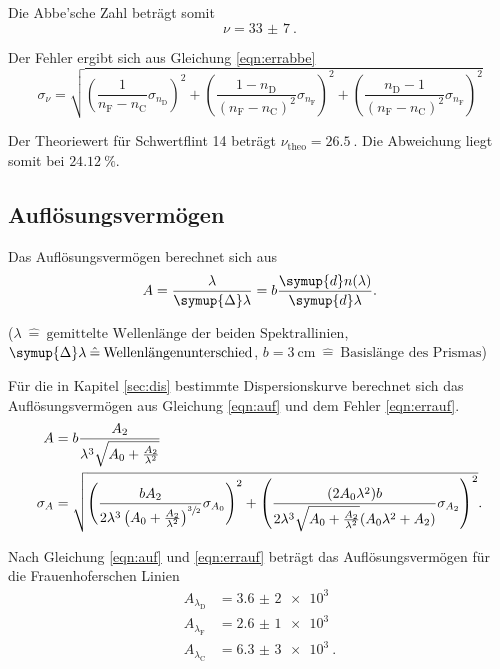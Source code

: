 Die Abbe'sche Zahl beträgt somit
\begin{equation*}
  \nu = \SI{33(7)}{}.
\end{equation*}

Der Fehler ergibt sich aus Gleichung \eqref{eqn:errabbe}
\begin{equation}
  \sigma_\nu = \sqrt{\left( \frac{1}{n_\text{F}-n_\text{C}} \sigma_{n_\text{D}} \right)^2 + \left(\frac{1-n_\text{D}}{(n_\text{F}-n_\text{C})^2} \sigma_{n_\text{F}} \right)^2 + \left(\frac{n_\text{D}-1}{(n_\text{F}-n_\text{C})^2} \sigma_{n_\text{F}} \right)^2}
  \label{eqn:errabbe}
\end{equation}

Der Theoriewert \cite{sample4} für Schwertflint 14 beträgt $\nu_\text{theo} = \SI{26,5}{}$. Die Abweichung liegt somit bei $\SI{24,12}{\%}$.

\subsection{Auflösungsvermögen}

Das Auflösungsvermögen berechnet sich aus
\begin{equation}
  A = \frac{\lambda}{\symup{\Delta} \lambda} = b \frac{\symup{d} n(\lambda)}{\symup{d} \lambda}.
\end{equation}
\begin{center}
  \tiny{($\lambda \: \hat{=} \: \text{gemittelte Wellenlänge der beiden Spektrallinien}$, $\symup{\Delta}\lambda \: \hat{=} \: \text{Wellenlängenunterschied}$, $b = \SI{3}{\cm} \: \hat{=} \: \text{Basislänge des Prismas}$)}
\end{center}

Für die in Kapitel \ref{sec:dis} bestimmte Dispersionskurve berechnet sich das Auflösungsvermögen aus Gleichung \eqref{eqn:auf} und
dem Fehler \eqref{eqn:errauf}.
\begin{align}
  A &= b \frac{A_2}{\lambda^3 \sqrt{A_0 + \frac{A_2}{\lambda^2}}} \label{eqn:auf} \\
  \sigma_A &= \sqrt{\left(\frac{b A_2}{2 \lambda^3 \left(A_0 + \frac{A_2}{\lambda^2} \right)^{\sfrac{3}{2}}} \sigma_{A_0}\right)^2 + \left(\frac{(2 A_0 \lambda^2) b}{2 \lambda^3 \sqrt{A_0 + \frac{A_2}{\lambda^2}} (A_0 \lambda^2 + A_2)} \sigma_{A_2}\right)^2} \label{eqn:errauf}.
\end{align}

Nach Gleichung \eqref{eqn:auf} und \eqref{eqn:errauf} beträgt das Auflösungsvermögen für die Frauenhoferschen Linien
\begin{align*}
  A_{\lambda_\text{D}} &= \SI{3,6(2)e3}{} \\
  A_{\lambda_\text{F}} &= \SI{2,6(1)e3}{} \\
  A_{\lambda_\text{C}} &= \SI{6,3(3)e3}{}.
\end{align*}

